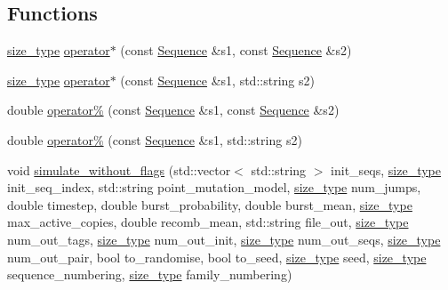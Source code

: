 \subsection*{Functions}
\begin{DoxyCompactItemize}
\item 
\hyperlink{namespaceretrocombinator_a8e1541b50cee66a791df4c437ccbb385}{size\+\_\+type} \hyperlink{namespaceretrocombinator_a2d223ac406c9e02cf5687c709ad5da9d}{operator$\ast$} (const \hyperlink{classretrocombinator_1_1Sequence}{Sequence} \&s1, const \hyperlink{classretrocombinator_1_1Sequence}{Sequence} \&s2)
\item 
\hyperlink{namespaceretrocombinator_a8e1541b50cee66a791df4c437ccbb385}{size\+\_\+type} \hyperlink{namespaceretrocombinator_a33fa303439100639ad5432a19b8c01d4}{operator$\ast$} (const \hyperlink{classretrocombinator_1_1Sequence}{Sequence} \&s1, std\+::string s2)
\item 
double \hyperlink{namespaceretrocombinator_a08dcf1f00c5ea301ff04e3389ed9b3e1}{operator\%} (const \hyperlink{classretrocombinator_1_1Sequence}{Sequence} \&s1, const \hyperlink{classretrocombinator_1_1Sequence}{Sequence} \&s2)
\item 
double \hyperlink{namespaceretrocombinator_a540b38522d54f6df8c0b7d9541b287c7}{operator\%} (const \hyperlink{classretrocombinator_1_1Sequence}{Sequence} \&s1, std\+::string s2)
\item 
void \hyperlink{namespaceretrocombinator_ab4bb894621063b932d80c1473b359534}{simulate\+\_\+without\+\_\+flags} (std\+::vector$<$ std\+::string $>$ init\+\_\+seqs, \hyperlink{namespaceretrocombinator_a8e1541b50cee66a791df4c437ccbb385}{size\+\_\+type} init\+\_\+seq\+\_\+index, std\+::string point\+\_\+mutation\+\_\+model, \hyperlink{namespaceretrocombinator_a8e1541b50cee66a791df4c437ccbb385}{size\+\_\+type} num\+\_\+jumps, double timestep, double burst\+\_\+probability, double burst\+\_\+mean, \hyperlink{namespaceretrocombinator_a8e1541b50cee66a791df4c437ccbb385}{size\+\_\+type} max\+\_\+active\+\_\+copies, double recomb\+\_\+mean, std\+::string file\+\_\+out, \hyperlink{namespaceretrocombinator_a8e1541b50cee66a791df4c437ccbb385}{size\+\_\+type} num\+\_\+out\+\_\+tags, \hyperlink{namespaceretrocombinator_a8e1541b50cee66a791df4c437ccbb385}{size\+\_\+type} num\+\_\+out\+\_\+init, \hyperlink{namespaceretrocombinator_a8e1541b50cee66a791df4c437ccbb385}{size\+\_\+type} num\+\_\+out\+\_\+seqs, \hyperlink{namespaceretrocombinator_a8e1541b50cee66a791df4c437ccbb385}{size\+\_\+type} num\+\_\+out\+\_\+pair, bool to\+\_\+randomise, bool to\+\_\+seed, \hyperlink{namespaceretrocombinator_a8e1541b50cee66a791df4c437ccbb385}{size\+\_\+type} seed, \hyperlink{namespaceretrocombinator_a8e1541b50cee66a791df4c437ccbb385}{size\+\_\+type} sequence\+\_\+numbering, \hyperlink{namespaceretrocombinator_a8e1541b50cee66a791df4c437ccbb385}{size\+\_\+type} family\+\_\+numbering)

\end{DoxyCompactItemize}
